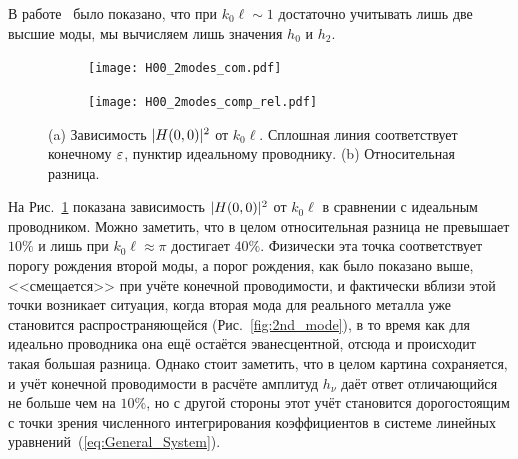 В работе~\cite{Shapiro16} было показано, что при 
$k_0 \ell \sim 1$ достаточно учитывать лишь две высшие моды, мы вычисляем лишь значения $h_0$ и $h_2$.
\begin{figure}
  \begin{subfigure}[t]{1\textwidth}
    \texttt{[image: H00\_2modes\_com.pdf]}
    \caption{}
  \end{subfigure}
  
  \begin{subfigure}[t]{1\textwidth}
    \texttt{[image: H00\_2modes\_comp\_rel.pdf]}
    \caption{}
  \end{subfigure}
  \caption{(a) Зависимость $\lvert H(0,0)\rvert^2$ от $k_0 \ell$. Сплошная линия соответствует конечному $\varepsilon$, пунктир идеальному проводнику. (b) Относительная разница.}	\label{pic:comp}
\end{figure}
На Рис.~\ref{pic:comp} показана зависимость $\lvert H(0,0)\rvert^2$ от $k_0 \ell$ в сравнении с идеальным проводником. Можно заметить, что в целом 
относительная разница не превышает  $10\%$ и лишь при  $k_0 \ell \approx \pi$ достигает $40\%$. Физически эта точка 
соответствует порогу рождения второй моды, а порог рождения, как было показано выше, <<смещается>> при учёте конечной проводимости, и фактически
вблизи этой точки возникает ситуация, когда вторая мода для реального металла уже становится распространяющейся (Рис.~\ref{fig:2nd_mode}), 
в то время как для идеально проводника
она ещё остаётся эванесцентной, отсюда и происходит такая большая разница. Однако стоит заметить, что в целом картина сохраняется,
и учёт конечной проводимости в расчёте амплитуд $h_\nu$ даёт ответ отличающийся не больше чем на $10\%$, но с другой стороны этот учёт 
становится дорогостоящим с точки зрения численного интегрирования  коэффициентов в системе линейных уравнений~(\ref{eq:General_System}).


